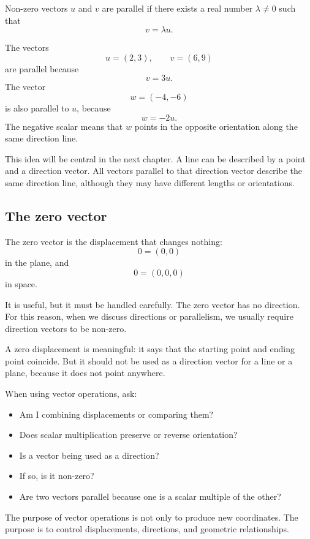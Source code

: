 \begin{definitionbox}
Non-zero vectors \(u\) and \(v\) are parallel if there exists a real number \(\lambda\ne0\) such that
\[
v=\lambda u.
\]
\end{definitionbox}

\begin{examplebox}
The vectors
\[
u=(2,3),
\qquad
v=(6,9)
\]
are parallel because
\[
v=3u.
\]
The vector
\[
w=(-4,-6)
\]
is also parallel to \(u\), because
\[
w=-2u.
\]
The negative scalar means that \(w\) points in the opposite orientation along the same direction line.
\end{examplebox}

This idea will be central in the next chapter. A line can be described by a point and a direction vector. All vectors parallel to that direction vector describe the same direction line, although they may have different lengths or orientations.

\subsection*{The zero vector}

The zero vector is the displacement that changes nothing:
\[
0=(0,0)
\]
in the plane, and
\[
0=(0,0,0)
\]
in space.

It is useful, but it must be handled carefully. The zero vector has no direction. For this reason, when we discuss directions or parallelism, we usually require direction vectors to be non-zero.

\begin{remarkbox}
A zero displacement is meaningful: it says that the starting point and ending point coincide. But it should not be used as a direction vector for a line or a plane, because it does not point anywhere.
\end{remarkbox}

\begin{summarybox}
When using vector operations, ask:
\begin{itemize}
\item Am I combining displacements or comparing them?
\item Does scalar multiplication preserve or reverse orientation?
\item Is a vector being used as a direction?
\item If so, is it non-zero?
\item Are two vectors parallel because one is a scalar multiple of the other?
\end{itemize}
\end{summarybox}

The purpose of vector operations is not only to produce new coordinates. The purpose is to control displacements, directions, and geometric relationships.